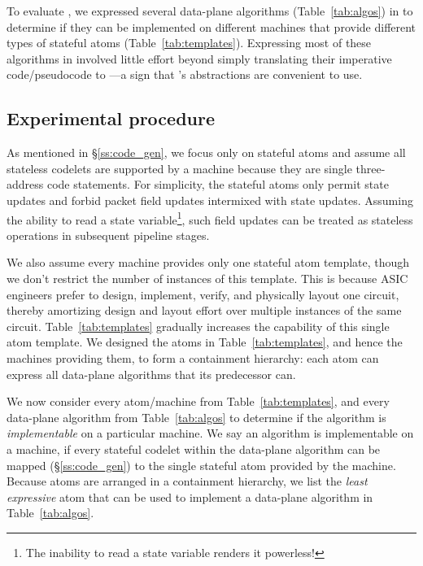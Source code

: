 To evaluate \pktlanguage, we expressed several data-plane algorithms
(Table~\ref{tab:algos}) in \pktlanguage to determine if they can be implemented
on different \absmachine machines that provide different types of stateful
atoms (Table~\ref{tab:templates}). Expressing most of these algorithms in
\pktlanguage involved little effort beyond simply translating their imperative
code/pseudocode to \pktlanguage---a sign that \pktlanguage's abstractions are
convenient to use.


\subsection{Experimental procedure}
As mentioned in \S\ref{ss:code_gen}, we focus only on stateful atoms and assume
all stateless codelets are supported by a \absmachine machine because they are
single three-address code statements. For simplicity, the stateful atoms only
permit state updates and forbid packet field updates intermixed with state
updates.  Assuming the ability to read a state variable\footnote{The inability
to read a state variable renders it powerless!}, such field updates can be
treated as stateless operations in subsequent pipeline stages.

We also assume every \absmachine machine provides only one stateful atom
template, though we don't restrict the number of instances of this template.
This is because ASIC engineers prefer to design, implement, verify, and
physically layout one circuit, thereby amortizing design and layout effort over
multiple instances of the same circuit.  Table~\ref{tab:templates} gradually
increases the capability of this single atom template.  We designed the atoms
in Table~\ref{tab:templates}, and hence the \absmachine machines providing
them, to form a containment hierarchy: each atom can express all data-plane
algorithms that its predecessor can.

We now consider every atom/\absmachine machine from Table~\ref{tab:templates},
and every data-plane algorithm from Table~\ref{tab:algos} to determine if the
algorithm is \textit{implementable} on a particular \absmachine machine. We say
an algorithm is implementable on a \absmachine machine, if every stateful
codelet within the data-plane algorithm can be mapped (\S\ref{ss:code_gen}) to
the single stateful atom provided by the \absmachine machine. Because
atoms are arranged in a containment hierarchy, we list the \textit{least
expressive} atom that can be used to implement a data-plane algorithm in
Table~\ref{tab:algos}.

